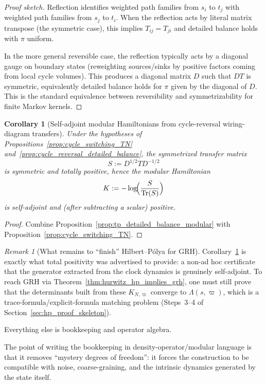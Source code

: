 \documentclass[11pt,oneside]{amsbook}
\numberwithin{equation}{section}
\theoremstyle{plain}
\newtheorem{corollary}[theorem]{Corollary}
\theoremstyle{definition}
\theoremstyle{remark}
\newtheorem{remark}[theorem]{Remark}
\DeclareMathOperator{\Tr}{\mathrm{Tr}}
\begin{document}
\begin{proof}[Proof sketch]
Reflection identifies weighted path families from $s_i$ to $t_j$ with weighted path families from $s_j$ to $t_i$.
When the reflection acts by literal matrix transpose (the symmetric case), this implies $T_{ij}=T_{ji}$ and detailed balance holds with $\pi$ uniform.

In the more general reversible case, the reflection typically acts by a diagonal gauge on boundary states (reweighting sources/sinks by positive factors coming from local cycle volumes).
This produces a diagonal matrix $D$ such that $D T$ is symmetric, equivalently detailed balance holds for $\pi$ given by the diagonal of $D$.
This is the standard equivalence between reversibility and symmetrizability for finite Markov kernels.
\end{proof}

\begin{corollary}[Self-adjoint modular Hamiltonians from cycle-reversal wiring-diagram transfers]
\label{cor:cycle_reversal_self_adjoint}
Under the hypotheses of Propositions~\ref{prop:cycle_switching_TN} and~\ref{prop:cycle_reversal_detailed_balance}, the symmetrized transfer matrix
\[
S:=D^{1/2} T D^{-1/2}
\]
is symmetric and totally positive, hence the modular Hamiltonian
\[
K:=-\log\!\Bigl(\frac{S}{\Tr(S)}\Bigr)
\]
is self-adjoint and (after subtracting a scalar) positive.
\end{corollary}

\begin{proof}
Combine Proposition~\ref{prop:tp_detailed_balance_modular} with Proposition~\ref{prop:cycle_switching_TN}.
\end{proof}

\begin{remark}[What remains to ``finish'' Hilbert--Pólya for GRH]
Corollary~\ref{cor:cycle_reversal_self_adjoint} is exactly what total positivity was advertised to provide: a non-ad hoc certificate that the generator extracted from the clock dynamics is genuinely self-adjoint.
To reach GRH via Theorem~\ref{thm:hurwitz_hp_implies_grh}, one must still prove that the determinants built from these $K_{N,\varpi}$ converge to $\Lambda(s,\varpi)$, which is a trace-formula/explicit-formula matching problem (Steps~3--4 of Section~\ref{sec:hp_proof_skeleton}).
\end{remark}

Everything else is bookkeeping and operator algebra.

The point of writing the bookkeeping in density-operator/modular language is that it removes ``mystery degrees of freedom'': it forces the construction to be compatible with noise, coarse-graining, and the intrinsic dynamics generated by the state itself.
\end{document}
